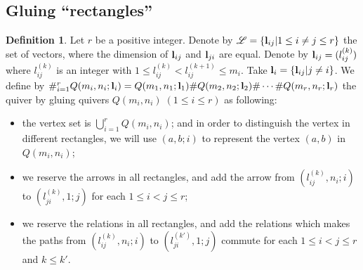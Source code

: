 \documentclass[a4paper, reqno]{amsart}
\theoremstyle{definition}
\newtheorem{defn}[thm]{Definition}
\theoremstyle{remark}
\numberwithin{equation}{section}
\begin{document}
\subsection{Gluing ``rectangles''}
\begin{defn}\label{defnOfGluing}
Let $r$ be a positive integer. Denote by $\mathscr{L}=\{{\bf{l}}_{ij}|1\leq i\neq j\leq r\}$ the set of vectors, where the dimension of ${\bf{l}}_{ij}$ and ${\bf{l}}_{ji}$ are equal. Denote by ${\bf{l}}_{ij}=(l_{ij}^{(k)})$ where $l_{ij}^{(k)}$ is an integer with $1\leq l_{ij}^{(k)}<l_{ij}^{(k+1)}\leq m_i$. Take ${\bf{l}}_i=\{{\bf{l}}_{ij}|j\neq i\}$. We define by $\#_{i=1}^r Q(m_i,n_i;{\bf{l}}_i)=Q(m_1,n_1;{\bf{l}}_1)\#Q(m_2,n_2;{\bf{l}}_2)\#\cdots\#Q(m_r,n_r;{\bf{l}}_r)$ the quiver by gluing quivers $Q(m_i,n_i)\;(1\leq i\leq r)$ as following:
\begin{itemize}
\item the vertex set is $\bigcup_{i=1}^r  Q(m_i,n_i)$; and in order to distinguish the vertex in different rectangles, we will use $(a,b;i)$ to represent the vertex $(a,b)$ in $Q(m_i,n_i)$;
\item we reserve the arrows in all rectangles, and add the arrow from $(l_{ij}^{(k)},n_i;i)$ to $(l_{ji}^{(k)},1;j)$ for each $1\leq i<j\leq r$;
\item we reserve the relations in all rectangles, and add the relations which makes the paths from $(l_{ij}^{(k)},n_i;i)$ to $(l_{ji}^{(k')},1;j)$ commute for each $1\leq i<j\leq r$ and $k\leq k'$.
\end{itemize}
\end{defn}
\end{document}
